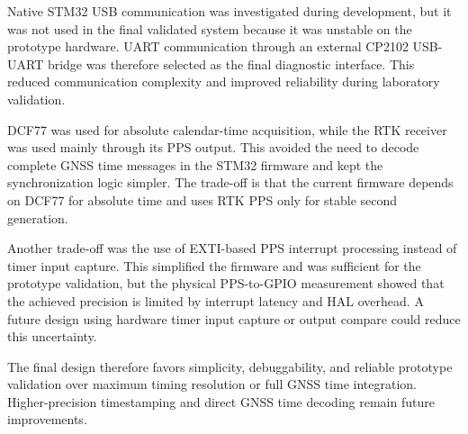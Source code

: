 Native STM32 USB communication was investigated during development, but it was not used in the final validated system because it was unstable on the prototype hardware. UART communication through an external CP2102 USB-UART bridge was therefore selected as the final diagnostic interface. This reduced communication complexity and improved reliability during laboratory validation.

DCF77 was used for absolute calendar-time acquisition, while the RTK receiver was used mainly through its PPS output. This avoided the need to decode complete GNSS time messages in the STM32 firmware and kept the synchronization logic simpler. The trade-off is that the current firmware depends on DCF77 for absolute time and uses RTK PPS only for stable second generation.

Another trade-off was the use of EXTI-based PPS interrupt processing instead of timer input capture. This simplified the firmware and was sufficient for the prototype validation, but the physical PPS-to-GPIO measurement showed that the achieved precision is limited by interrupt latency and HAL overhead. A future design using hardware timer input capture or output compare could reduce this uncertainty.

The final design therefore favors simplicity, debuggability, and reliable prototype validation over maximum timing resolution or full GNSS time integration. Higher-precision timestamping and direct GNSS time decoding remain future improvements.

